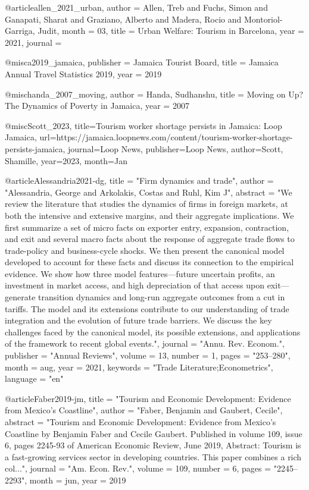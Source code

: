 {@article{allen_2021_urban,
	author = {Allen, Treb and Fuchs, Simon and Ganapati, Sharat and Graziano, Alberto and Madera, Rocio and Montoriol-Garriga, Judit},
	month = {03},
	title = {Urban Welfare: Tourism in Barcelona},
	year = {2021},
	journal = {}
}

@misc{a2019_jamaica,
	publisher = {Jamaica Tourist Board},
	title = {Jamaica Annual Travel Statistics 2019},
	year = {2019}
}


@misc{handa_2007_moving,
	author = {Handa, Sudhanshu},
	title = {Moving on Up? The Dynamics of Poverty in Jamaica},
	year = {2007}
}

@misc{Scott_2023, title={Tourism worker shortage persists in Jamaica: Loop Jamaica}, url={https://jamaica.loopnews.com/content/tourism-worker-shortage-persists-jamaica}, journal={Loop News}, publisher={Loop News}, author={Scott, Shamille}, year={2023}, month={Jan}}

@article{Alessandria2021-dg,
	title     = "Firm dynamics and trade",
	author    = "Alessandria, George and Arkolakis, Costas and Ruhl, Kim J",
	abstract  = "We review the literature that studies the dynamics of firms in
	foreign markets, at both the intensive and extensive margins,
	and their aggregate implications. We first summarize a set of
	micro facts on exporter entry, expansion, contraction, and exit
	and several macro facts about the response of aggregate trade
	flows to trade-policy and business-cycle shocks. We then present
	the canonical model developed to account for these facts and
	discuss its connection to the empirical evidence. We show how
	three model features---future uncertain profits, an investment
	in market access, and high depreciation of that access upon
	exit---generate transition dynamics and long-run aggregate
	outcomes from a cut in tariffs. The model and its extensions
	contribute to our understanding of trade integration and the
	evolution of future trade barriers. We discuss the key
	challenges faced by the canonical model, its possible
	extensions, and applications of the framework to recent global
	events.",
	journal   = "Annu. Rev. Econom.",
	publisher = "Annual Reviews",
	volume    =  13,
	number    =  1,
	pages     = "253--280",
	month     =  aug,
	year      =  2021,
	keywords  = "Trade Literature;Econometrics",
	language  = "en"
}

@article{Faber2019-jm,
	title    = "Tourism and Economic Development: Evidence from Mexico's
	Coastline",
	author   = "Faber, Benjamin and Gaubert, Cecile",
	abstract = "Tourism and Economic Development: Evidence from Mexico's
	Coastline by Benjamin Faber and Cecile Gaubert. Published in
	volume 109, issue 6, pages 2245-93 of American Economic Review,
	June 2019, Abstract: Tourism is a fast-growing services sector in
	developing countries. This paper combines a rich col...",
	journal  = "Am. Econ. Rev.",
	volume   =  109,
	number   =  6,
	pages    = "2245--2293",
	month    =  jun,
	year     =  2019
}

}

